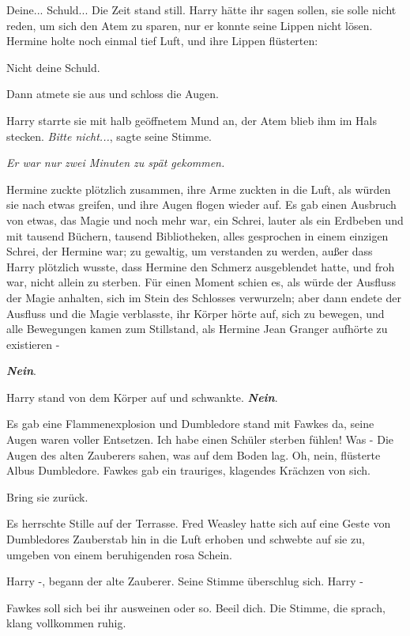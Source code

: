 \glqq{}Deine... Schuld...\grqq{} Die Zeit stand still. Harry hätte ihr sagen
sollen, sie solle nicht reden, um sich den Atem zu sparen, nur er konnte seine
Lippen nicht lösen. Hermine holte noch einmal tief Luft, und ihre Lippen
flüsterten:

\glqq{}Nicht deine Schuld.\grqq{}

Dann atmete sie aus und schloss die Augen.

Harry starrte sie mit halb geöffnetem Mund an, der Atem blieb ihm im Hals
stecken. \glqq{}\emph{Bitte nicht...}\grqq{}, sagte seine Stimme.

\emph{Er war nur zwei Minuten zu spät gekommen.}

Hermine zuckte plötzlich zusammen, ihre Arme zuckten in die Luft, als würden sie
nach etwas greifen, und ihre Augen flogen wieder auf. Es gab einen Ausbruch von
etwas, das Magie und noch mehr war, ein Schrei, lauter als ein Erdbeben und mit
tausend Büchern, tausend Bibliotheken, alles gesprochen in einem einzigen
Schrei, der Hermine war; zu gewaltig, um verstanden zu werden, außer dass Harry
plötzlich wusste, dass Hermine den Schmerz ausgeblendet hatte, und froh war,
nicht allein zu sterben. Für einen Moment schien es, als würde der Ausfluss der
Magie anhalten, sich im Stein des Schlosses verwurzeln; aber dann endete der
Ausfluss und die Magie verblasste, ihr Körper hörte auf, sich zu bewegen, und
alle Bewegungen kamen zum Stillstand, als Hermine Jean Granger aufhörte zu
existieren -

\textbf{\emph{Nein}}.

Harry stand von dem Körper auf und schwankte.
\textbf{}
\textbf{\emph{Nein}}.

Es gab eine Flammenexplosion und Dumbledore stand mit Fawkes da, seine Augen
waren voller Entsetzen. \glqq{}Ich habe einen Schüler sterben fühlen! Was
-\grqq{} Die Augen des alten Zauberers sahen, was auf dem Boden lag. \glqq{}Oh,
nein\grqq{}, flüsterte Albus Dumbledore. Fawkes gab ein trauriges, klagendes
Krächzen von sich.

\glqq{}Bring sie zurück.\grqq{}

Es herrschte Stille auf der Terrasse. Fred Weasley hatte sich auf eine Geste von
Dumbledores Zauberstab hin in die Luft erhoben und schwebte auf sie zu, umgeben
von einem beruhigenden rosa Schein.

\glqq{}Harry -\grqq{}, begann der alte Zauberer. Seine Stimme überschlug sich.
\glqq{}Harry -\grqq{}

\glqq{}Fawkes soll sich bei ihr ausweinen oder so. Beeil dich.\grqq{} Die Stimme,
die sprach, klang vollkommen ruhig.

